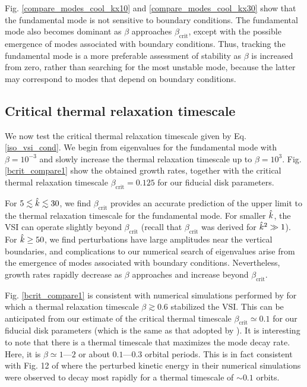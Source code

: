 Fig. \ref{compare_modes_cool_kx10} and \ref{compare_modes_cool_kx30} 
show that the fundamental mode is not sensitive to boundary
conditions. The fundamental mode also becomes dominant as $\beta$
approaches $\beta_\mathrm{crit}$, except with the possible emergence
of modes associated with boundary conditions. Thus, tracking the
fundamental mode is a more preferable assessment of stability as $\beta$
is increased from zero, rather than searching for the most unstable
mode, because the latter may correspond to modes that depend on boundary
conditions.   



\subsection{Critical thermal relaxation
  timescale}\label{bcrit_num_test}
We now test the critical thermal relaxation timescale given by
Eq. \ref{iso_vsi_cond}. We begin from eigenvalues for the fundamental
mode with $\beta=10^{-3}$ and slowly increase the thermal
relaxation timescale up to $\beta=10^3$. Fig. \ref{bcrit_compare1}
show the obtained growth rates, together with the critical  
thermal relaxation timescale $\beta_\mathrm{crit}=0.125$ for our
fiducial disk parameters.   

For $5\lesssim\hat{k}\lesssim30$, we find $\beta_\mathrm{crit}$ provides
an accurate prediction of the upper limit to the thermal relaxation 
timescale for the fundamental mode. For smaller $\hat{k}$, the VSI can
operate slightly beyond $\beta_\mathrm{crit}$ (recall that
$\beta_\mathrm{crit}$ was derived for $\hat{k}^2\gg 1$). For
$\hat{k}\geq 50$, we find perturbations have large amplitudes near the
 vertical boundaries, and 
complications to our numerical search of
eigenvalues arise from the emergence of modes associated with boundary
conditions. %
Nevertheless, growth rates rapidly decrease as $\beta$
approaches and increase beyond $\beta_\mathrm{crit}$.  

Fig. \ref{bcrit_compare1} is consistent with numerical simulations
performed by \cite{nelson13} for which a thermal relaxation timescale
$\beta\gtrsim 0.6$ stabilized the VSI. This can be anticipated from our
estimate of the critical thermal timescale $\beta_\mathrm{crit}\simeq
0.1$ for our fiducial disk parameters (which is the same as that
adopted by \citeauthor{nelson13}). It is interesting to note that there is a
thermal timescale that maximizes the mode decay rate. Here,
it is $\beta\simeq1$---$2$ or 
about $0.1$---$0.3$ orbital periods. This is in fact consistent with 
Fig. 12 of \cite{nelson13} where the perturbed kinetic energy in their
numerical simulations were observed to decay most rapidly for a
thermal timescale of $\sim 0.1$ orbits.     

